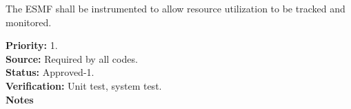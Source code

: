 The ESMF shall be instrumented to allow resource utilization
to be tracked and monitored.
\label{req:gr:error_handling}
\begin{reqlist}
  {\bf Priority:} 1. \\
  {\bf Source:} Required by all codes. \\
  {\bf Status:} Approved-1. \\
  {\bf Verification:} Unit test, system test.\\
  {\bf Notes}
\end{reqlist}





